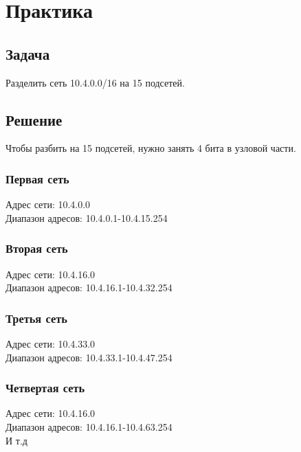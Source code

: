 \chapter{Практика}

\section{Задача}
Разделить сеть 10.4.0.0/16 на 15 подсетей.

\section{Решение}

Чтобы разбить на 15 подсетей, нужно занять 4 бита в узловой части.

\subsection{Первая сеть}
Адрес сети: 10.4.0.0 \\
Диапазон адресов: 10.4.0.1-10.4.15.254

\subsection{Вторая сеть}
Адрес сети: 10.4.16.0 \\
Диапазон адресов: 10.4.16.1-10.4.32.254

\subsection{Третья сеть}
Адрес сети: 10.4.33.0 \\
Диапазон адресов: 10.4.33.1-10.4.47.254

\subsection{Четвертая сеть}
Адрес сети: 10.4.16.0 \\
Диапазон адресов: 10.4.16.1-10.4.63.254 \\

И т.д


\endinput